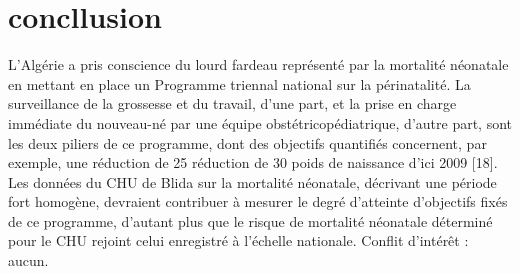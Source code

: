 \section{concllusion}
L’Algérie a pris conscience du lourd fardeau représenté par la
mortalité néonatale en mettant en place un Programme
triennal national sur la périnatalité. La surveillance de la
grossesse et du travail, d’une part, et la prise en charge
immédiate du nouveau-né par une équipe obstétricopédiatrique,
d’autre part, sont les deux piliers de ce programme,
dont des objectifs quantifiés concernent, par exemple, une
réduction de 25 %
réduction de 30 %
poids de naissance d’ici 2009 [18].
Les données du CHU de Blida sur la mortalité néonatale,
décrivant une période fort homogène, devraient contribuer
à mesurer le degré d’atteinte d’objectifs fixés de ce
programme, d’autant plus que le risque de mortalité
néonatale déterminé pour le CHU rejoint celui enregistré à
l’échelle nationale.
Conflit d’intérêt : aucun.	